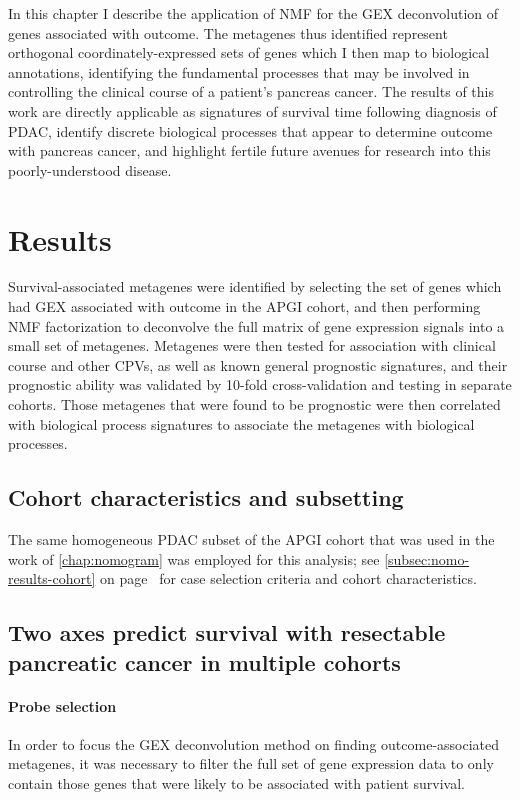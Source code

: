 \documentclass[dissertation.tex]{subfiles}
\begin{document}
In this chapter I describe the application of \gls{NMF} for the \gls{GEX} deconvolution of genes associated with outcome.  The metagenes thus identified represent orthogonal coordinately-expressed sets of genes which I then map to biological annotations, identifying the fundamental processes that may be involved in controlling the clinical course of a patient's pancreas cancer.  The results of this work are directly applicable as signatures of survival time following diagnosis of \gls{PDAC}, identify discrete biological processes that appear to determine outcome with pancreas cancer, and highlight fertile future avenues for research into this poorly-understood disease.


\section{Results}

Survival-associated metagenes were identified by selecting the set of genes which had \gls{GEX} associated with outcome in the \gls{APGI} cohort, and then performing \gls{NMF} factorization to deconvolve the full matrix of gene expression signals into a small set of metagenes.  Metagenes were then tested for association with clinical course and other \glspl{CPV}, as well as known general prognostic signatures, and their prognostic ability was validated by 10-fold cross-validation and testing in separate cohorts.  Those metagenes that were found to be prognostic were then correlated with biological process signatures to associate the metagenes with biological processes.

\subsection{Cohort characteristics and subsetting}
The same homogeneous \gls{PDAC} subset of the \gls{APGI} cohort that was used in the work of \cref{chap:nomogram} was employed for this analysis; see \cref{subsec:nomo-results-cohort} on page~\pageref{subsec:nomo-results-cohort} for case selection criteria and cohort characteristics.

\subsection{Two axes predict survival with resectable pancreatic cancer in multiple cohorts}
\paragraph{Probe selection}
In order to focus the \gls{GEX} deconvolution method on finding outcome-associated metagenes, it was necessary to filter the full set of gene expression data to only contain those genes that were likely to be associated with patient survival.
\end{document}
